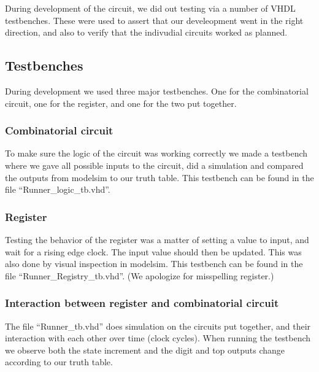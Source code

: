 During development of the circuit, we did out testing via a number of VHDL testbenches. These were used to assert that our 
develeopment went in the right direction, and also to verify that the indivudial circuits worked as planned.

\subsection{Testbenches}
During development we used three major testbenches. One for the combinatorial circuit, one for the register, and one for the 
two put together. 

\subsubsection{Combinatorial circuit}
To make sure the logic of the circuit was working correctly we made a testbench where we gave all possible inputs to the circuit,
did a simulation and compared the outputs from modelsim to our truth table. This testbench can be found in the file ``Runner\_logic\_tb.vhd''.

\subsubsection{Register}
Testing the behavior of the register was a matter of setting a value to input, and wait for a rising edge clock. The input value 
should then be updated. This was also done by visual inspection in modelsim. This testbench can be found in the file ``Runner\_Registry\_tb.vhd''. 
(We apologize for misspelling register.)

\subsubsection{Interaction between register and combinatorial circuit}
The file ``Runner\_tb.vhd'' does simulation on the circuits put together, and their interaction with each other over time (clock cycles). 
When running the testbench we observe both the state increment and the digit and top outputs change according to our truth table.